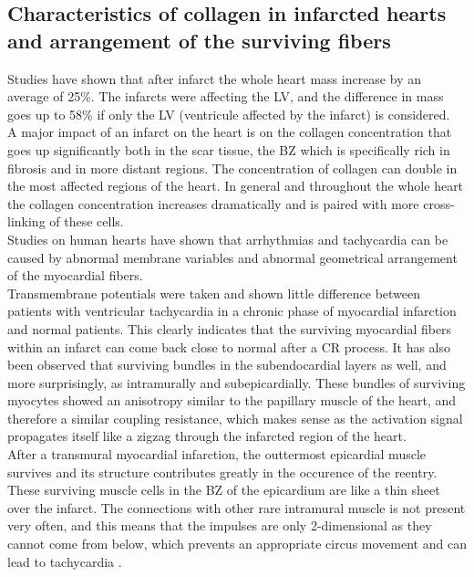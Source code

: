 \subsection{Characteristics of collagen in infarcted hearts and arrangement of the surviving fibers}

Studies \cite{mccormick1994regional} have shown that after infarct the whole heart mass increase by an average of 25\%. The infarcts were affecting the LV, and the difference in mass goes up to 58\% if only the LV (ventricule affected by the infarct) is considered.\\
A major impact of an infarct on the heart is on the collagen concentration that goes up significantly both in the scar tissue, the BZ which is specifically rich in fibrosis and in more distant regions. The concentration of collagen can double in the most affected regions of the heart. In general and throughout the whole heart the collagen concentration increases dramatically and is paired with more cross-linking of these cells.\\
Studies on human hearts \cite{de1990ventricular} have shown that arrhythmias and tachycardia can be caused by abnormal membrane variables and abnormal geometrical arrangement of the myocardial fibers.\\
Transmembrane potentials were taken and shown little difference between patients with ventricular tachycardia in a chronic phase of myocardial infarction and normal patients. This clearly indicates that the surviving myocardial fibers within an infarct can come back close to normal after a CR process. It has also been observed that surviving bundles in the subendocardial layers as well, and more surprisingly, as intramurally and subepicardially. These bundles of surviving myocytes showed an anisotropy similar to the papillary muscle of the heart, and therefore a similar coupling resistance, which makes sense as the activation signal propagates itself like a zigzag through the infarcted region of the heart.\\
After a transmural myocardial infarction, the outtermost epicardial muscle survives and its structure contributes greatly in the occurence of the reentry. These surviving muscle cells in the BZ of the epicardium are like a thin sheet over the infarct. The connections with other rare intramural muscle is not present very often, and this means that the impulses are only 2-dimensional as they cannot come from below, which prevents an appropriate circus movement and can lead to tachycardia \cite{ursell1985structural}.